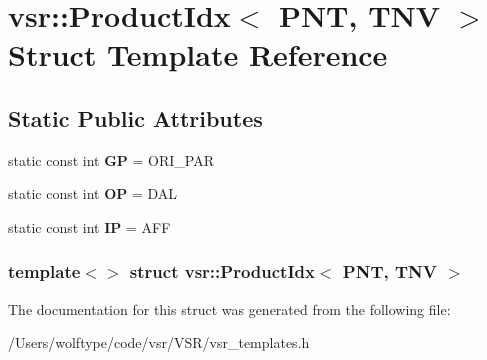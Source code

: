 \hypertarget{structvsr_1_1_product_idx_3_01_p_n_t_00_01_t_n_v_01_4}{\section{vsr\-:\-:Product\-Idx$<$ P\-N\-T, T\-N\-V $>$ Struct Template Reference}
\label{structvsr_1_1_product_idx_3_01_p_n_t_00_01_t_n_v_01_4}
}
\subsection*{Static Public Attributes}
\begin{DoxyCompactItemize}
\item 
\hypertarget{structvsr_1_1_product_idx_3_01_p_n_t_00_01_t_n_v_01_4_a345bfc8699a32d34d8f7c9f4c57e39bf}{static const int {\bfseries G\-P} = O\-R\-I\-\_\-\-P\-A\-R}\label{structvsr_1_1_product_idx_3_01_p_n_t_00_01_t_n_v_01_4_a345bfc8699a32d34d8f7c9f4c57e39bf}

\item 
\hypertarget{structvsr_1_1_product_idx_3_01_p_n_t_00_01_t_n_v_01_4_a2d20f9637b5d8783bcd4a8458a3e9110}{static const int {\bfseries O\-P} = D\-A\-L}\label{structvsr_1_1_product_idx_3_01_p_n_t_00_01_t_n_v_01_4_a2d20f9637b5d8783bcd4a8458a3e9110}

\item 
\hypertarget{structvsr_1_1_product_idx_3_01_p_n_t_00_01_t_n_v_01_4_a3c7bc465abaaf244232c74151bf27248}{static const int {\bfseries I\-P} = A\-F\-F}\label{structvsr_1_1_product_idx_3_01_p_n_t_00_01_t_n_v_01_4_a3c7bc465abaaf244232c74151bf27248}

\end{DoxyCompactItemize}
\subsubsection*{template$<$$>$ struct vsr\-::\-Product\-Idx$<$ P\-N\-T, T\-N\-V $>$}



The documentation for this struct was generated from the following file\-:\begin{DoxyCompactItemize}
\item 
/\-Users/wolftype/code/vsr/\-V\-S\-R/vsr\-\_\-templates.\-h\end{DoxyCompactItemize}
